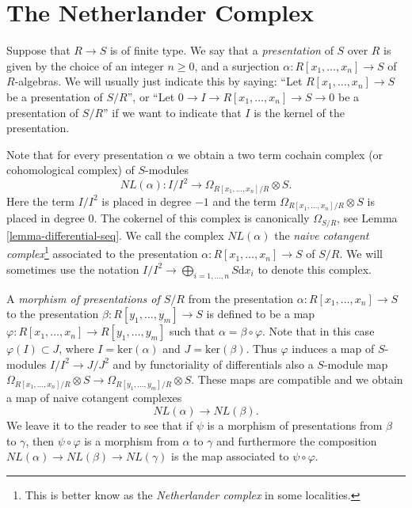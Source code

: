 \section{The Netherlander Complex}
\label{section-netherlander}

\noindent
Suppose that $R \to S$ is of finite type.
We say that a {\it presentation} of $S$ over $R$ is
given by the choice of an integer $n \geq 0$, and
a surjection $\alpha : R[x_1, \ldots, x_n] \to S$
of $R$-algebras. We will usually just indicate
this by saying: ``Let $R[x_1, \ldots, x_n] \to S$ be a presentation of
$S/R$'', or ``Let $0\to I \to R[x_1, \ldots, x_n] \to S \to 0$
be a presentation of $S/R$'' if we want to indicate that $I$
is the kernel of the presentation.

\medskip\noindent
Note that for every presentation $\alpha$ we obtain a two term
cochain complex (or cohomological complex) of $S$-modules
$$
NL(\alpha) :
I/I^2 \longrightarrow \Omega_{R[x_1, \ldots, x_n]/R}\otimes S.
$$
Here the term $I/I^2$ is placed in degree $-1$ and
the term $\Omega_{R[x_1, \ldots, x_n]/R}\otimes S$ is
placed in degree $0$.
The cokernel of this complex is canonically $\Omega_{S/R}$,
see Lemma \ref{lemma-differential-seq}. We call the complex
$NL(\alpha)$
the {\it naive cotangent complex}\footnote{This is better know as the {\it
Netherlander complex} in some localities.} associated to the
presentation $\alpha : R[x_1, \ldots, x_n] \to S$ of $S/R$. We will
sometimes use the notation
$I/I^2 \to \bigoplus_{i = 1, \ldots, n} S\text{d}x_i$
to denote this complex.

\medskip\noindent
A {\it morphism of presentations of $S/R$} from the presentation
$\alpha : R[x_1, \ldots, x_n] \to S$ to the presentation
$\beta : R[y_1, \ldots, y_m] \to S$ is defined to be a
map $\varphi : R[x_1, \ldots, x_n] \to R[y_1, \ldots, y_m]$
such that $\alpha = \beta \circ \varphi$. Note that
in this case $\varphi(I) \subset J$, where $I = \text{ker}(\alpha)$
and $J = \text{ker}(\beta)$. Thus $\varphi$ induces a map
of $S$-modules $I/I^2 \to J/J^2$ and by functoriality of
differentials also a $S$-module map
$\Omega_{R[x_1, \ldots, x_n]/R}\otimes S
\to \Omega_{R[y_1, \ldots, y_m]/R}\otimes S$.
These maps are compatible and we obtain a map
of naive cotangent complexes
$$
NL(\alpha) \longrightarrow NL(\beta).
$$
We leave it to the reader to see that if $\psi$ is a morphism
of presentations from $\beta$ to $\gamma$, then $\psi \circ \varphi$
is a morphism from $\alpha$ to $\gamma$ and furthermore
the composition $NL(\alpha) \to NL(\beta) \to NL(\gamma)$
is the map associated to $\psi \circ \varphi$.

